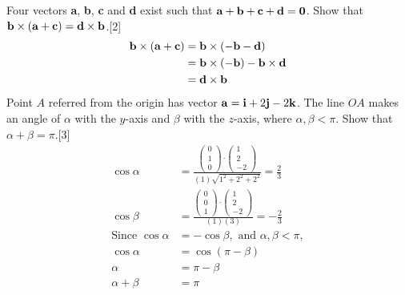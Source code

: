 \documentclass[12pt, a4 paper]{article}
\begin{document}
\begin{outline}[enumerate]
	\color{black}
	\2 Four vectors \textbf{a}, \textbf{b}, \textbf{c} and \textbf{d} exist such that ${\bf{a}} + {\bf{b}} + {\bf{c}} + {\bf{d}} = {\bf{0}}$. Show that ${\bf{b}} \times ({\bf{a}} + {\bf{c}}) = {\bf{d}} \times {\bf{b}}$.\hfill[2]
	\color{blue}
	\begin{align*}
		{\bf{b}} \times ({\bf{a}} + {\bf{c}}) & = {\bf{b}} \times ( - {\bf{b}} - {\bf{d}})                 \\
		                                      & = {\bf{b}} \times ( - {\bf{b}}) - {\bf{b}} \times {\bf{d}} \\
		                                      & = {\bf{d}} \times {\bf{b}}                                 
	\end{align*}
	\color{black}
	\2 Point $A$ referred from the origin has vector ${\bf{a}} = {\bf{i}} + 2{\bf{j}} - 2{\bf{k}}$. The line $OA$ makes an angle of $\alpha $ with the $y$-axis and $\beta $ with the $z$-axis, where $\alpha ,\beta  < \pi $. Show that $\alpha  + \beta  = \pi $.\hfill[3]
	\color{blue}
	\begin{align*}
		\cos \alpha                  & = \frac{{\left( {\begin{array}{*{20}{c}}0               \\1\\0\end{array}} \right) \cdot \left( {\begin{array}{*{20}{c}}1\\2\\{ - 2}\end{array}} \right)}}{{(1)\sqrt {{1^2} + {2^2} + {2^2}} }} = \frac{2}{3} \\
		\cos \beta                   & = \frac{{\left( {\begin{array}{*{20}{c}}0               \\0\\1\end{array}} \right) \cdot \left( {\begin{array}{*{20}{c}}1\\2\\{ - 2}\end{array}} \right)}}{{(1)(3)}} =  - \frac{2}{3} \\
		{\textrm{Since }}\cos \alpha & =  - \cos \beta ,{\textrm{ and }}\alpha ,\beta  < \pi , \\
		\cos \alpha                  & = \cos (\pi  - \beta )                                  \\
		\alpha                       & = \pi  - \beta                                          \\
		\alpha  + \beta              & = \pi                                                   
	\end{align*}
			

\end{outline}
\end{document}
